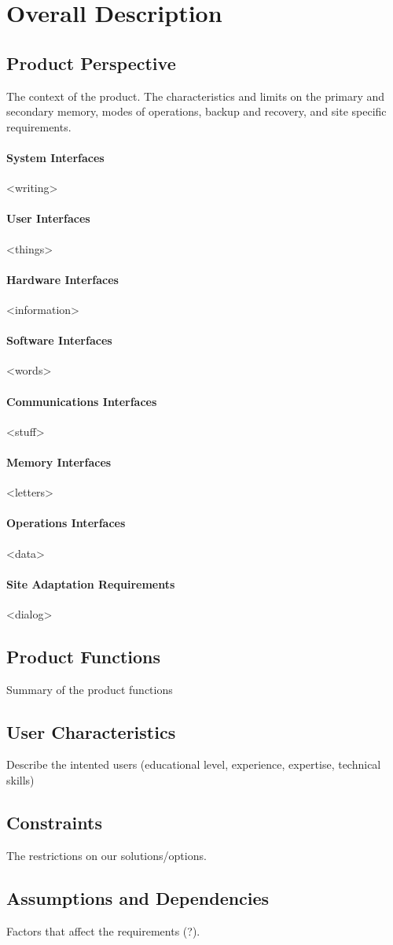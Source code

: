 \section{Overall Description}
	\subsection{Product Perspective}
	The context of the product. The characteristics and limits on the primary and secondary memory, modes of operations, backup and recovery, and site specific requirements.

	\paragraph{System Interfaces}
	<writing>
	\paragraph{User Interfaces}
	<things>
	\paragraph{Hardware Interfaces}
	<information>
	\paragraph{Software Interfaces}
	<words>
	\paragraph{Communications Interfaces}
	<stuff>
	\paragraph{Memory Interfaces}
	<letters>
	\paragraph{Operations Interfaces}
	<data>
	\paragraph{Site Adaptation Requirements}
	<dialog>
	
	\subsection{Product Functions}
	Summary of the product functions
	
	\subsection{User Characteristics}
	Describe the intented users (educational level, experience, expertise, technical skills)
	
	\subsection{Constraints}
	The restrictions on our solutions/options.
	
	\subsection{Assumptions and Dependencies}
	Factors that affect the requirements (?).
